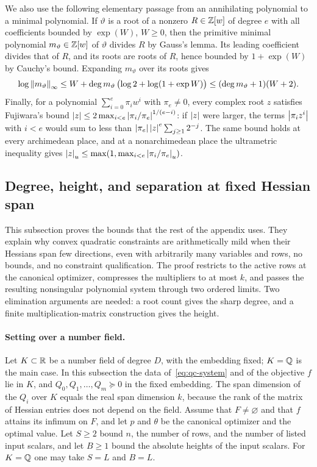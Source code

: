 We also use the following elementary passage from an annihilating
polynomial to a minimal polynomial. If $\vartheta$ is a root of a nonzero
$R\in\mathbb Z[w]$ of degree $e$ with all coefficients bounded by $\exp(W)$, $W\ge0$,
then the primitive minimal polynomial $m_\vartheta\in\mathbb Z[w]$ of $\vartheta$
divides $R$ by Gauss's lemma. Its leading coefficient divides that of $R$, and
its roots are roots of $R$, hence bounded by $1+\exp(W)$ by Cauchy's bound.
Expanding $m_\vartheta$ over its roots gives
\begin{equation}
\label{eq:qc-minpoly-height}
\log\left\lVert m_\vartheta\right\rVert_\infty\le W+\deg m_\vartheta\,\bigl(\log2+\log(1+\exp W)\bigr)
\le(\deg m_\vartheta+1)(W+2).
\end{equation}
Finally, for a polynomial $\sum_{i=0}^e\pi_iw^i$ with $\pi_e\ne0$, every
complex root $z$ satisfies Fujiwara's bound
$\left\lvert z\right\rvert\le2\max_{i<e}\left\lvert\pi_i/\pi_e\right\rvert^{1/(e-i)}$: if $\left\lvert z\right\rvert$ were larger,
the terms $\left\lvert\pi_iz^i\right\rvert$ with $i<e$ would sum to less than
$\left\lvert\pi_e\right\rvert\left\lvert z\right\rvert^e\sum_{j\ge1}2^{-j}$. The same bound holds at every
archimedean place, and at a nonarchimedean place the ultrametric inequality
gives $\left\lvert z\right\rvert_u\le\max(1,\max_{i<e}\left\lvert\pi_i/\pi_e\right\rvert_u)$.

\subsection{Degree, height, and separation at fixed Hessian span}
\label{app:qc-degree}

This subsection proves the bounds that the rest of the appendix uses. They
explain why convex quadratic constraints are arithmetically mild when their
Hessians span few directions, even with arbitrarily many variables and rows,
no bounds, and no constraint qualification. The proof restricts to the active
rows at the canonical optimizer, compresses the multipliers to at most $k$,
and passes the resulting nonsingular polynomial system through two ordered
limits. Two elimination arguments are needed: a root count gives the sharp
degree, and a finite multiplication-matrix construction gives the height.

\paragraph{Setting over a number field.}
Let $K\subset\mathbb R$ be a number field of degree $D$, with the embedding fixed;
$K=\mathbb Q$ is the main case. In this subsection the data of~\eqref{eq:qc-system}
and of the objective $f$ lie in $K$, and $Q_0,Q_1,\ldots,Q_m\succeq0$ in the
fixed embedding. The span dimension of the $Q_i$ over $K$ equals the real span
dimension $k$, because the rank of the matrix of Hessian entries does not
depend on the field. Assume that $F\ne\varnothing$ and that $f$ attains its
infimum on $F$, and let $p$ and $\theta$ be the canonical optimizer and the
optimal value. Let $S\ge2$ bound $n$, the number of rows, and the number of
listed input scalars, and let $B\ge1$ bound the absolute heights of the input
scalars. For $K=\mathbb Q$ one may take $S=L$ and $B=L$.


